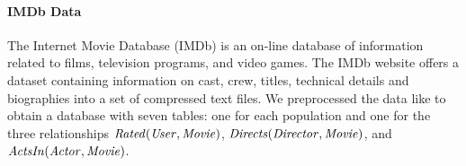 {				\paragraph{IMDb Data} 
				The Internet Movie Database (IMDb) is an on-line database of information related to films, television programs, and video games.
				The IMDb website offers a dataset containing information on cast, crew, titles, technical details and biographies into a set of compressed text files. 
				We preprocessed the data like \citep{Peralta2007} to obtain a database with seven tables: one for each population and one for the three relationships $\it{Rated}(\it{User},\it{Movie})$, $\it{Directs}(\it{Director},\it{Movie})$, and $\it{ActsIn}(\mathit{Actor},\it{Movie})$.
				
				
}
